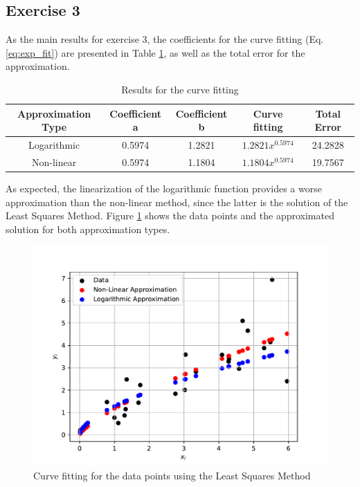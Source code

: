 \subsection{Exercise 3}\label{subsec:exercise_3}
As the main results for exercise 3, the coefficients for the curve fitting (Eq. \eqref{eq:exp_fit}) are presented in Table \ref{tab:results_ex3}, as well as the total error for the approximation.
\begin{table}[htb!]
    \centering
    \caption{Results for the curve fitting}
    \begin{tabular}{ccccc}
        \hline
        \textbf{Approximation Type} & \textbf{Coefficient a} & \textbf{Coefficient b} & \textbf{Curve fitting} & \textbf{Total Error}\\ \hline
        Logarithmic & 0.5974 & 1.2821 & $1.2821x^{0.5974}$ & 24.2828 \\
        Non-linear & 0.5974 & 1.1804 & $1.1804x^{0.5974}$ & 19.7567\\ \hline
    \end{tabular}
    \label{tab:results_ex3}
\end{table}

As expected, the linearization of the logarithmic function provides a worse approximation than the non-linear method, since the latter is the solution of the Least Squares Method. Figure \ref{fig:curve_fitting} shows the data points and the approximated solution for both approximation types.
\begin{figure}[htb!]
    \centering
    \includegraphics[scale=.9]{Figures/Approx_Comparison.pdf}
    \caption{Curve fitting for the data points using the Least Squares Method}
    \label{fig:curve_fitting}
\end{figure}